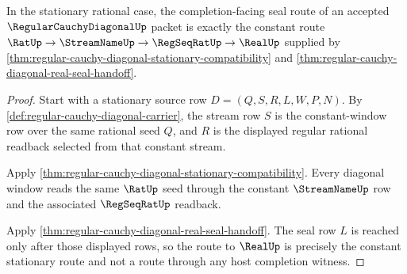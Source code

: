 \begin{theorem}
\label{thm:regular-cauchy-diagonal-stationary-seal-exactness}
In the stationary rational case, the completion-facing seal route of an accepted $\RegularCauchyDiagonalUp$ packet is exactly the constant route $\RatUp \to \StreamNameUp \to \RegSeqRatUp \to \RealUp$ supplied by \autoref{thm:regular-cauchy-diagonal-stationary-compatibility} and \autoref{thm:regular-cauchy-diagonal-real-seal-handoff}.
\end{theorem}
\begin{proof}
Start with a stationary source row $D=(Q,S,R,L,W,P,N)$. By \autoref{def:regular-cauchy-diagonal-carrier}, the stream row $S$ is the constant-window row over the same rational seed $Q$, and $R$ is the displayed regular rational readback selected from that constant stream.

Apply \autoref{thm:regular-cauchy-diagonal-stationary-compatibility}. Every diagonal window reads the same $\RatUp$ seed through the constant $\StreamNameUp$ row and the associated $\RegSeqRatUp$ readback.

Apply \autoref{thm:regular-cauchy-diagonal-real-seal-handoff}. The seal row $L$ is reached only after those displayed rows, so the route to $\RealUp$ is precisely the constant stationary route and not a route through any host completion witness.
\end{proof}

